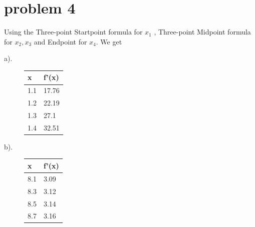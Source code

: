 \documentclass{article}
\begin{document}
\section{problem 4}
Using the Three-point Startpoint formula for $x_1$ , Three-point Midpoint formula for $x_2, x_3$ and Endpoint for $x_4$. We get
\begin{description}
\item[a).]
\begin{center}
\begin{tabular}{ll}
\hline
x&f'(x)\\\hline
1.1&17.76\\
1.2&22.19\\
1.3&27.1\\
1.4&32.51\\
\hline
\end{tabular}
\end{center}
\item[b).]
\begin{center}
\begin{tabular}{ll}
\hline
{\small x}&{\small f'(x)}\\
\hline
{\small 8.1}&{\small 3.09}\\
{\small 8.3}&{\small 3.12}\\
{\small 8.5}&{\small 3.14}\\
{\small 8.7}&{\small 3.16}\\
\hline
\end{tabular}
\end{center}
\end{description}
\end{document}
